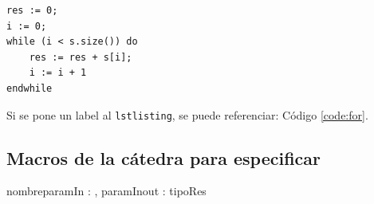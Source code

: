 \documentclass[10pt,a4paper]{article}
\begin{document}
	\begin{lstlisting}[caption={Ejemplo de código (usando los estilos de la cátedra, ver las macros para más detalles)},label=code:for]
res := 0;
i := 0;
while (i < s.size()) do
	res := res + s[i];
	i := i + 1
endwhile
	\end{lstlisting}

Si se pone un label al \verb|lstlisting|, se puede referenciar: Código \ref{code:for}.


\subsection{Macros de la cátedra para especificar}

\begin{proc}{nombre}{\In paramIn : \nat, \Inout paramInout : \TLista{\ent}}{tipoRes}
\end{proc}

\end{document}
